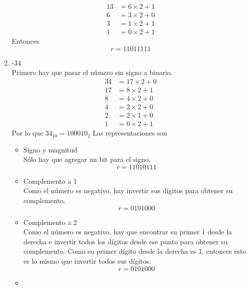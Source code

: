 \documentclass{article}
\begin{document}
\begin{enumerate}
{\begin{itemize}
{\begin{align*}
                        13 &= 6 \times 2 + 1 \\
                        6 &= 3 \times 2 + 0 \\
                        3 &= 1 \times 2 + 1 \\
                        1 &= 0 \times 2 + 1
                    \end{align*}
                    Entonces
                    \[r = 11011111\]
                    }
            \end{itemize}
        }
        \item {
            -34 \\
            Primero hay que pasar el número sin signo a binario.
            \begin{align*}
                34 &= 17 \times 2 + 0 \\
                17 &= 8 \times 2 + 1 \\
                8 &= 4 \times 2 + 0 \\
                4 &= 2 \times 2 + 0 \\
                2 &= 2 \times 1 + 0 \\
                1 &= 0 \times 2 + 1
            \end{align*}
            Por lo que $34_{10} = 100010_{2}$
            Las representaciones son 
            \begin{itemize}
                \item {
                    Signo y magnitud \\
                    Sólo hay que agregar un bit para el signo.
                    \[r = 11010111\]
                }
                \item {
                    Complemento a 1\\
                    Como el número es negativo, hay invertir sus dígitos para 
                    obtener su complemento.
                    \[r = 0101000\]
                }
                \item {
                    Complemento a 2\\
                    Como el número es negativo, hay que encontrar su primer 1 
                    desde la derecha e invertir todos los dígitos desde ese 
                    punto para obtener su complemento. Como su primer dígito 
                    desde la derecha es 1, entonces esto es lo mismo que 
                    invertir todos sus dígitos.
                    \[r = 0101000\]
                }
                \item {
}
\end{itemize}}
\end{enumerate}
\end{document}
